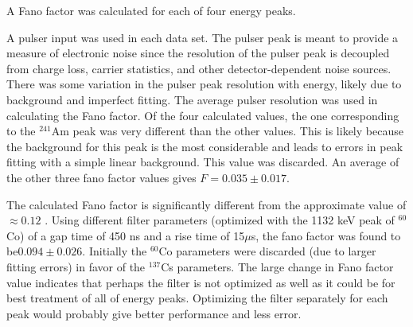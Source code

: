 A Fano factor was calculated for each of four energy peaks.
  
A pulser input was used in each data set. The pulser peak is meant to provide a measure of electronic noise since the resolution of the pulser peak is decoupled from charge loss, carrier statistics, and other detector-dependent noise sources. There was some variation in the pulser peak resolution with energy, likely due to background and imperfect fitting. The average pulser resolution was used in calculating the Fano factor. Of the four calculated values, the one corresponding to the ${}^{241}$Am peak was very different than the other values. This is likely because the background for this peak is the most considerable and leads to errors in peak fitting with a simple linear background. This value was discarded. An average of the other three fano factor values gives $F = 0.035 \pm0.017$.

The calculated Fano factor is significantly different from the approximate value of $\approx 0.12$ \cite{Knoll}. Using different filter parameters (optimized with the 1132 keV peak of ${}^{60}$Co) of a gap time of 450 ns and a rise time of 15$\mu$s, the fano factor was found to be$ 0.094 \pm 0.026$. Initially the ${}^{60}$Co parameters were discarded (due to larger fitting errors) in favor of the $^{137}$Cs parameters. The large change in Fano factor value indicates that perhaps the filter is not optimized as well as it could be for best treatment of all of energy peaks. Optimizing the filter separately for each peak would probably give better performance and less error.